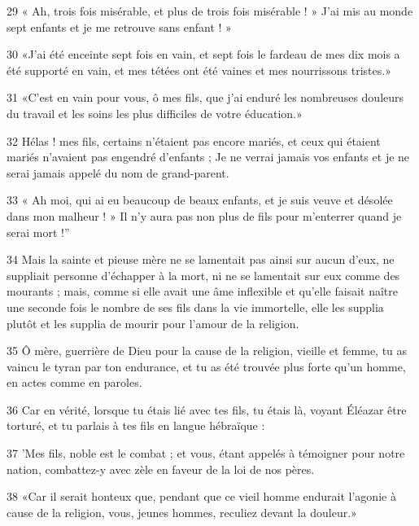 \par 29 « Ah, trois fois misérable, et plus de trois fois misérable ! » J'ai mis au monde sept enfants et je me retrouve sans enfant ! »

\par 30 «J'ai été enceinte sept fois en vain, et sept fois le fardeau de mes dix mois a été supporté en vain, et mes tétées ont été vaines et mes nourrissons tristes.»

\par 31 «C'est en vain pour vous, ô mes fils, que j'ai enduré les nombreuses douleurs du travail et les soins les plus difficiles de votre éducation.»

\par 32 Hélas ! mes fils, certains n'étaient pas encore mariés, et ceux qui étaient mariés n'avaient pas engendré d'enfants ; Je ne verrai jamais vos enfants et je ne serai jamais appelé du nom de grand-parent.

\par 33 « Ah moi, qui ai eu beaucoup de beaux enfants, et je suis veuve et désolée dans mon malheur ! » Il n'y aura pas non plus de fils pour m'enterrer quand je serai mort !''

\par 34 Mais la sainte et pieuse mère ne se lamentait pas ainsi sur aucun d'eux, ne suppliait personne d'échapper à la mort, ni ne se lamentait sur eux comme des mourants ; mais, comme si elle avait une âme inflexible et qu'elle faisait naître une seconde fois le nombre de ses fils dans la vie immortelle, elle les supplia plutôt et les supplia de mourir pour l'amour de la religion.

\par 35 Ô mère, guerrière de Dieu pour la cause de la religion, vieille et femme, tu as vaincu le tyran par ton endurance, et tu as été trouvée plus forte qu'un homme, en actes comme en paroles.

\par 36 Car en vérité, lorsque tu étais lié avec tes fils, tu étais là, voyant Éléazar être torturé, et tu parlais à tes fils en langue hébraïque :

\par 37 'Mes fils, noble est le combat ; et vous, étant appelés à témoigner pour notre nation, combattez-y avec zèle en faveur de la loi de nos pères.

\par 38 «Car il serait honteux que, pendant que ce vieil homme endurait l'agonie à cause de la religion, vous, jeunes hommes, reculiez devant la douleur.»

